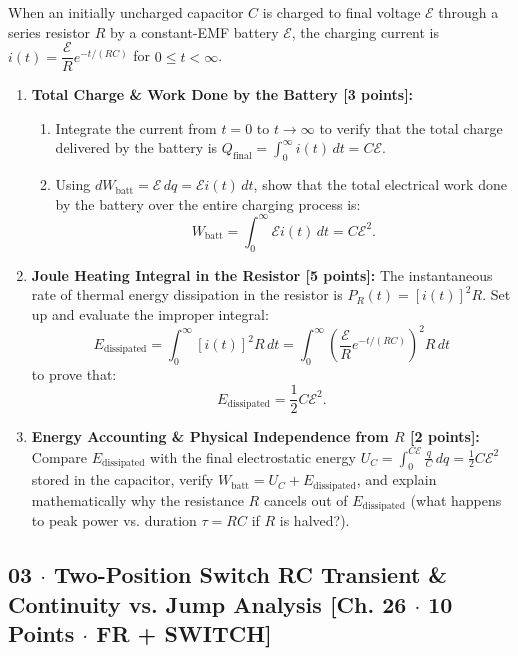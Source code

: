 \documentclass[10pt,letterpaper]{article}
\begin{document}
When an initially uncharged capacitor $C$ is charged to final voltage $\mathcal{E}$ through a series resistor $R$ by a constant-EMF battery $\mathcal{E}$, the charging current is $i(t) = \dfrac{\mathcal{E}}{R} e^{-t/(RC)}$ for $0 \le t < \infty$.

\begin{enumerate}
  \item \textbf{Total Charge \& Work Done by the Battery [3 points]:}
    \begin{enumerate}
      \item Integrate the current from $t = 0$ to $t \to \infty$ to verify that the total charge delivered by the battery is $Q_{\text{final}} = \int_0^\infty i(t)\,dt = C\mathcal{E}$.
      \item Using $dW_{\text{batt}} = \mathcal{E}\,dq = \mathcal{E} i(t)\,dt$, show that the total electrical work done by the battery over the entire charging process is:
      $$W_{\text{batt}} = \int_{0}^{\infty} \mathcal{E} i(t)\,dt = C\mathcal{E}^2.$$
    \end{enumerate}
  
  \item \textbf{Joule Heating Integral in the Resistor [5 points]:} The instantaneous rate of thermal energy dissipation in the resistor is $P_R(t) = [i(t)]^2 R$. Set up and evaluate the improper integral:
  $$E_{\text{dissipated}} = \int_{0}^{\infty} [i(t)]^2 R\,dt = \int_{0}^{\infty} \left(\frac{\mathcal{E}}{R} e^{-t/(RC)}\right)^2 R\,dt$$
  to prove that:
  $$E_{\text{dissipated}} = \frac{1}{2} C\mathcal{E}^2.$$
  \item \textbf{Energy Accounting \& Physical Independence from $R$ [2 points]:} Compare $E_{\text{dissipated}}$ with the final electrostatic energy $U_C = \int_0^{C\mathcal{E}} \frac{q}{C}\,dq = \frac{1}{2}C\mathcal{E}^2$ stored in the capacitor, verify $W_{\text{batt}} = U_C + E_{\text{dissipated}}$, and explain mathematically why the resistance $R$ cancels out of $E_{\text{dissipated}}$ (what happens to peak power vs. duration $\tau = RC$ if $R$ is halved?).
\end{enumerate}
\vspace{1.2in}


\newpage



\subsection*{03 $\cdot$ Two-Position Switch RC Transient \& Continuity vs. Jump Analysis \hfill [Ch. 26 $\cdot$ 10 Points $\cdot$ FR + SWITCH]}
\end{document}
